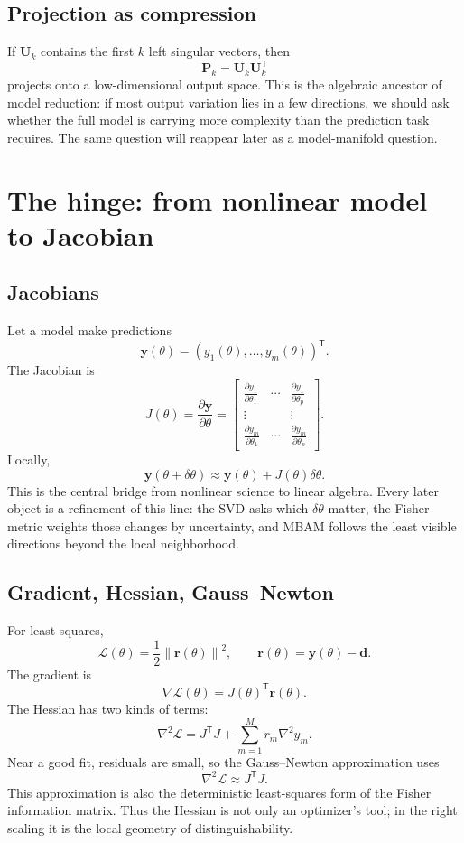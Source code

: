 \documentclass[a4paper]{article}
\newcommand{\pd}[2]{\frac{\partial #1}{\partial #2}}
\newcommand{\mat}[1]{\mathbf{#1}}
\newcommand{\vect}[1]{\mathbf{#1}}
\newcommand{\param}{\theta}
\newcommand{\loss}{\mathcal{L}}
\newcommand{\norm}[1]{\left\lVert #1\right\rVert}
\newcommand{\transpose}{\mathsf{T}}
\newcommand{\jac}{J}
\begin{document}
\subsection{Projection as compression}

If \(\mat{U}_k\) contains the first \(k\) left singular vectors, then
\[
  \mat{P}_k=\mat{U}_k\mat{U}_k^{\transpose}
\]
projects onto a low-dimensional output space.  This is the algebraic ancestor of model reduction: if most output variation lies in a few directions, we should ask whether the full model is carrying more complexity than the prediction task requires.  The same question will reappear later as a model-manifold question.

\section{The hinge: from nonlinear model to Jacobian}

\subsection{Jacobians}

Let a model make predictions
\[
  \vect{y}(\param)
  =
  (y_1(\param),\ldots,y_m(\param))^{\transpose}.
\]
The Jacobian is
\[
  \jac(\param)
  =
  \pd{\vect{y}}{\param}
  =
  \begin{bmatrix}
    \pd{y_1}{\theta_1} & \cdots & \pd{y_1}{\theta_p}\\
    \vdots & & \vdots\\
    \pd{y_m}{\theta_1} & \cdots & \pd{y_m}{\theta_p}
  \end{bmatrix}.
\]
Locally,
\[
  \vect{y}(\param+\delta\param)
  \approx
  \vect{y}(\param)+\jac(\param)\delta\param.
\]
This is the central bridge from nonlinear science to linear algebra.  Every later object is a refinement of this line: the SVD asks which \(\delta\param\) matter, the Fisher metric weights those changes by uncertainty, and MBAM follows the least visible directions beyond the local neighborhood.

\subsection{Gradient, Hessian, Gauss--Newton}

For least squares,
\[
  \loss(\param)
  =
  \frac{1}{2}\norm{\vect{r}(\param)}^2,
  \qquad
  \vect{r}(\param)=\vect{y}(\param)-\vect{d}.
\]
The gradient is
\[
  \nabla\loss(\param)
  =
  \jac(\param)^{\transpose}\vect{r}(\param).
\]
The Hessian has two kinds of terms:
\[
  \nabla^2\loss
  =
  \jac^{\transpose}\jac
  +
  \sum_{m=1}^M r_m\nabla^2 y_m.
\]
Near a good fit, residuals are small, so the Gauss--Newton approximation uses
\[
  \nabla^2\loss
  \approx
  \jac^{\transpose}\jac.
\]
This approximation is also the deterministic least-squares form of the Fisher information matrix.  Thus the Hessian is not only an optimizer's tool; in the right scaling it is the local geometry of distinguishability.
\end{document}
